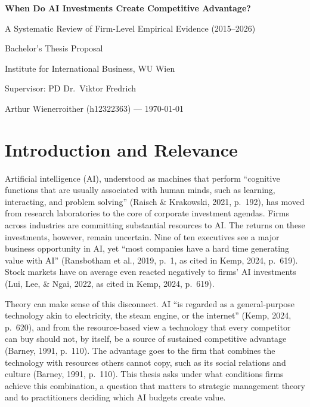 \documentclass[12pt, a4paper]{article}
\begin{document}
\begin{center}
  {\LARGE\bfseries When Do AI Investments Create Competitive Advantage?\par}
  \vspace{0.3cm}
  {\large A Systematic Review of Firm-Level Empirical Evidence (2015--2026)\par}
  \vspace{0.6cm}
  {\normalsize Bachelor's Thesis Proposal\par}
  {\normalsize Institute for International Business, WU Wien\par}
  {\normalsize Supervisor: PD Dr.\ Viktor Fredrich\par}
  \vspace{0.3cm}
  {\normalsize Arthur Wienerroither (h12322363) --- \today\par}
\end{center}
\vspace{0.5cm}

\section{Introduction and Relevance}

Artificial intelligence (AI), understood as machines that perform ``cognitive
functions that are usually associated with human minds, such as learning,
interacting, and problem solving'' (Raisch \& Krakowski, 2021, p.~192),
has moved from research laboratories to the core of corporate investment agendas.
Firms across industries are committing substantial resources to AI. The
returns on these investments, however, remain uncertain. Nine of ten executives see a major
business opportunity in AI, yet ``most companies have a hard time
generating value with AI'' (Ransbotham et al., 2019, p.~1, as cited in Kemp, 2024,
p.~619).
Stock markets have on average even reacted negatively to firms' AI investments
(Lui, Lee, \& Ngai, 2022, as cited in Kemp, 2024, p.~619).

Theory can make sense of this disconnect. AI ``is regarded as a general-purpose technology akin
to electricity, the steam engine, or the internet'' (Kemp, 2024, p.~620),
and from the resource-based view a technology that every competitor can buy
should not, by itself, be a source of sustained competitive advantage (Barney,
1991, p.~110). The advantage goes to the firm that combines the
technology with resources others cannot copy, such as its social relations
and culture (Barney, 1991, p.~110). This thesis asks under what conditions firms
achieve this combination, a question that matters to strategic management
theory and to practitioners deciding which AI budgets create value.
\end{document}
